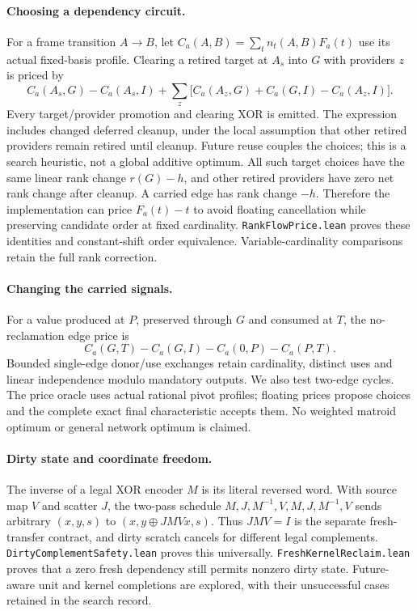 \documentclass[11pt]{article}
\begin{document}
\paragraph{Choosing a dependency circuit.}
For a frame transition $A\to B$, let
$C_a(A,B)=\sum_t n_t(A,B)F_a(t)$ use its actual fixed-basis profile.
Clearing a retired target at $A_s$ into $G$ with providers $z$ is priced by
\[
 C_a(A_s,G)-C_a(A_s,I)+
 \sum_z\bigl[C_a(A_z,G)+C_a(G,I)-C_a(A_z,I)\bigr].
\]
Every target/provider promotion and clearing XOR is emitted. The expression
includes changed deferred cleanup, under the local assumption that other
retired providers remain retired until cleanup. Future reuse couples the
choices; this is a search heuristic, not a global additive optimum.
All such target choices have the same linear rank change $r(G)-h$, and other
retired providers have zero net rank change after cleanup. A carried edge has
rank change $-h$. Therefore the implementation can price $F_a(t)-t$ to avoid
floating cancellation while preserving candidate order at fixed cardinality.
\texttt{RankFlowPrice.lean} proves these identities and constant-shift order
equivalence. Variable-cardinality comparisons retain the full rank correction.

\paragraph{Changing the carried signals.}
For a value produced at $P$, preserved through $G$ and consumed at $T$, the
no-reclamation edge price is
\[
 C_a(G,T)-C_a(G,I)-C_a(0,P)-C_a(P,T).
\]
Bounded single-edge donor/use exchanges retain cardinality, distinct uses and
linear independence modulo mandatory outputs. We also test two-edge cycles.
The price oracle uses actual rational pivot profiles; floating prices propose
choices and the complete exact final characteristic accepts them. No weighted
matroid optimum or general network optimum is claimed.

\paragraph{Dirty state and coordinate freedom.}
The inverse of a legal XOR encoder $M$ is its literal reversed word. With
source map $V$ and scatter $J$, the two-pass schedule
$M,J,M^{-1},V,M,J,M^{-1},V$ sends arbitrary $(x,y,s)$ to
$(x,y\mathbin{\oplus}JMVx,s)$. Thus $JMV=I$ is the separate fresh-transfer
contract, and dirty scratch cancels for different legal complements.
\texttt{DirtyComplementSafety.lean} proves this universally.
\texttt{FreshKernelReclaim.lean} proves that a zero fresh dependency still
permits nonzero dirty state. Future-aware unit and kernel completions are
explored, with their unsuccessful cases retained in the search record.
\end{document}
